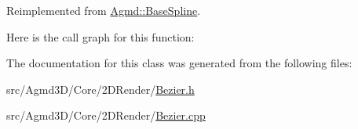 Reimplemented from \hyperlink{class_agmd_1_1_base_spline_a589f90c641d154374b477152de1ac7a7}{Agmd\+::\+Base\+Spline}.



Here is the call graph for this function\+:




The documentation for this class was generated from the following files\+:\begin{DoxyCompactItemize}
\item 
src/\+Agmd3\+D/\+Core/2\+D\+Render/\hyperlink{_bezier_8h}{Bezier.\+h}\item 
src/\+Agmd3\+D/\+Core/2\+D\+Render/\hyperlink{_bezier_8cpp}{Bezier.\+cpp}\end{DoxyCompactItemize}
